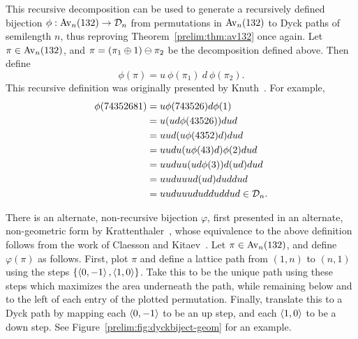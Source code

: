     This recursive decomposition can be used to generate a recursively defined
    bijection $\phi: \operatorname{{Av}}_n(132) \rightarrow \mathcal{D}_n$ from permutations in $\operatorname{{Av}}_n (132)$
    to Dyck paths of semilength $n$, thus reproving 
    Theorem~\ref{prelim:thm:av132} once again. Let $\pi \in \operatorname{{Av}}_n(132)$, and $\pi = (\pi_1
    \oplus 1) \ominus \pi_2$ be the decomposition defined above. Then define 
    $$\phi(\pi) = u \ \phi(\pi_1) \ d \ \phi(\pi_2).$$
    This recursive definition was originally presented by Knuth~\cite{Knuth}.
    For example, 
    $$ \begin{aligned}
      \phi(74352681) 
        &= u\phi(743526)d\phi(1) \\
        &= u (ud \phi(43526)) d ud \\
        &= uud (u\phi(4352)d) dud \\
        &= uudu (u\phi(43)d)\phi(2) dud\\
        &= uuduu (ud\phi(3))d (ud) dud \\
        &= uuduuud (ud) duddud \\
        &= uuduuududduddud \in \mathcal{D}_n.
    \end{aligned} $$
    
    There is an alternate, non-recursive bijection $\varphi$, first presented
    in an alternate, non-geometric form by
    Krattenthaler~\cite{Krattenthaler2001},
    whose equivalence to the above definition follows from the work of Claesson
    and Kitaev~\cite{Claesson2008}. Let $\pi \in \operatorname{{Av}}_n(132)$, and define
    $\varphi(\pi)$ as follows. First, plot $\pi$ and define a lattice path from
    $(1,n)$ to $(n,1)$ using the steps $\{\left\langle 0,-1 \right\rangle, \left\langle 1,0 \right\rangle\}$. Take this
    to be the unique path using these steps which maximizes the area underneath
    the path, while remaining below and to the left of each entry of the
    plotted permutation. Finally, translate this to a Dyck path by mapping each
    $\left\langle 0,-1 \right\rangle$ to be an up step, and each $\left\langle 1,0 \right\rangle$ to be a down step.
    See Figure~\ref{prelim:fig:dyckbiject-geom} for an example. 

